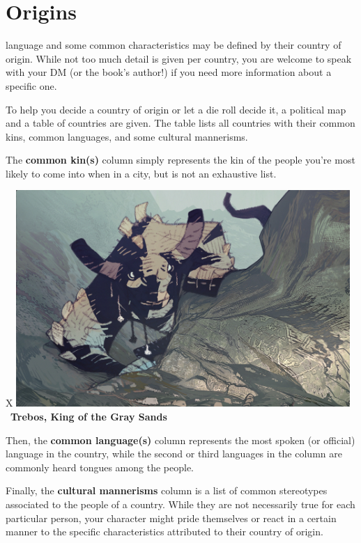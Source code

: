 \section{Origins}

language and some common characteristics may be defined by their country of origin.
While not too much detail is given per country, you are welcome to speak with your DM (or the book's author!) if you need more information about a specific one.

To help you decide a country of origin or let a die roll decide it, a political map and a table of countries are given.
The table lists all countries with their common kins, common languages, and some cultural mannerisms.

The \textbf{common kin(s)} column simply represents the kin of the people you're most likely to come into when in a city, but is not an exhaustive list.

\begin{table}[b]%
    \begin{DndTable}[width=\linewidth]{X}
        \centering
        \includegraphics[width=0.95\textwidth]{05background/img/king_of_the_gray_sands_trebos.jpg} \
        \centering \large{\textbf{Trebos, King of the Gray Sands}}
    \end{DndTable}
\end{table}

Then, the \textbf{common language(s)} column represents the most spoken (or official) language in the country, while the second or third languages in the column are commonly heard tongues among the people.

Finally, the \textbf{cultural mannerisms} column is a list of common stereotypes associated to the people of a country.
While they are not necessarily true for each particular person, your character might pride themselves or react in a certain manner to the specific characteristics attributed to their country of origin.


